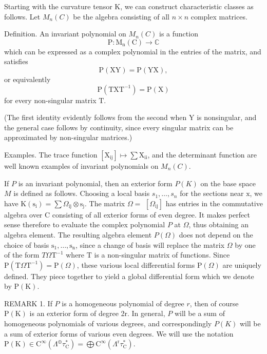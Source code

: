 \documentclass[10pt]{article}
\begin{document}
Starting with the curvature tensor $\mathrm{K}$, we can construct characteristic classes as follows. Let $M_{n}(C)$ be the algebra consisting of all $n \times n$ complex matrices.

Definition. An invariant polynomial on $M_{n}(C)$ is a function
$$
\mathrm{P}: \mathrm{M}_{\mathrm{n}}(\mathrm{C}) \rightarrow \mathbb{C}
$$
which can be expressed as a complex polynomial in the entries of the matrix, and satisfies
$$
\mathrm{P}(\mathrm{XY})=\mathrm{P}(\mathrm{YX}),
$$
or equivalently
$$
\mathrm{P}\left(\mathrm{TXT}^{-1}\right)=\mathrm{P}(\mathrm{X})
$$
for every non-singular matrix $\mathrm{T}$.

(The first identity evidently follows from the second when $\mathrm{Y}$ is nonsingular, and the general case follows by continuity, since every singular matrix can be approximated by non-singular matrices.)

Examples. The trace function $\left[\mathrm{X}_{\mathrm{ij}}\right] \mapsto \sum \mathrm{X}_{\mathrm{ii}}$, and the determinant function are well known examples of invariant polynomials on $M_{n}(C)$.

If $P$ is an invariant polynomial, then an exterior form $P(K)$ on the base space $M$ is defined as follows. Choosing a local basis $s_{1}, \ldots, s_{n}$ for the sections near $\mathrm{x}$, we have $\mathrm{K}\left(\mathrm{s}_{\mathrm{i}}\right)=\sum \Omega_{\mathrm{ij}} \otimes \mathrm{s}_{\mathrm{j}}$. The matrix $\Omega=$ $\left[\Omega_{\mathrm{ij}}\right]$ has entries in the commutative algebra over $\mathrm{C}$ consisting of all exterior forms of even degree. It makes perfect sense therefore to evaluate the complex polynomial $P$ at $\Omega$, thus obtaining an algebra element. The resulting algebra element $P(\Omega)$ does not depend on the choice of basis $\mathrm{s}_{1}, \ldots, \mathrm{s}_{\mathrm{n}}$, since a change of basis will replace the matrix $\Omega$ by one of the form $T \Omega \mathrm{T}^{-1}$ where $\mathrm{T}$ is a non-singular matrix of functions. Since $\mathrm{P}\left(\mathrm{T} \Omega \mathrm{T}^{-1}\right)=\mathrm{P}(\Omega)$, these various local differential forms $\mathrm{P}(\Omega)$ are uniquely defined. They piece together to yield a global differential form which we denote by $\mathrm{P}(\mathrm{K})$.

REMARK 1. If $P$ is a homogeneous polynomial of degree $r$, then of course $\mathrm{P}(\mathrm{K})$ is an exterior form of degree 2r. In general, $P$ will be a sum of homogeneous polynomials of various degrees, and correspondingly $P(K)$ will be a sum of exterior forms of various even degrees. We will use the notation $\mathrm{P}(\mathrm{K}) \in \mathrm{C}^{\infty}\left(\Lambda^{\oplus} \tau_{\mathrm{C}}^{*}\right)=\bigoplus \mathrm{C}^{\infty}\left(\Lambda^{\mathrm{r}} \tau_{\mathrm{C}}^{*}\right)$.
\end{document}
